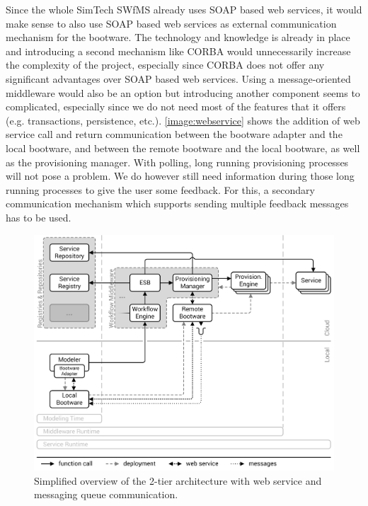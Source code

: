 Since the whole SimTech SWfMS already uses SOAP based web services, it would make sense to also use SOAP based web services as external communication mechanism for the bootware.
The technology and knowledge is already in place and introducing a second mechanism like CORBA would unnecessarily increase the complexity of the project, especially since CORBA does not offer any significant advantages over SOAP based web services.
Using a message-oriented middleware would also be an option but introducing another component seems to complicated, especially since we do not need most of the features that it offers (e.g. transactions, persistence, etc.).
\autoref{image:webservice} shows the addition of web service call and return communication between the bootware adapter and the local bootware, and between the remote bootware and the local bootware, as well as the provisioning manager.
With polling, long running provisioning processes will not pose a problem.
We do however still need information during those long running processes to give the user some feedback.
For this, a secondary communication mechanism which supports sending multiple feedback messages has to be used.

\begin{figure}[!htbp]
	\centering
	\includegraphics[resolution=600]{design/assets/message_queue}
	\caption{Simplified overview of the 2-tier architecture with web service and messaging queue communication.}
	\label{image:message_queue}
\end{figure}


